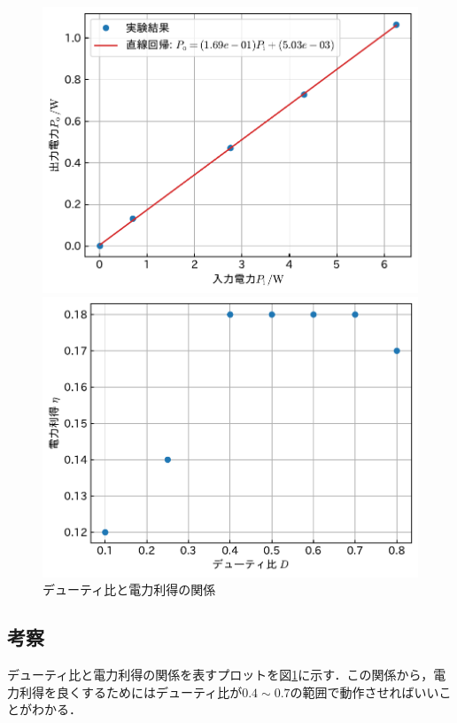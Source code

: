 \documentclass[1_power_supply.tex]{subfiles}
\begin{document}
\begin{figure}[htbp]
      \vspace{1.5mm}
      \begin{minipage}{0.45\columnwidth}
        \centering
        \includegraphics[width=0.8\columnwidth]{2_80p.pdf}
        \caption{$D=0.8$}\label{fig:2_80p}
      \end{minipage}
      \begin{minipage}{0.45\columnwidth}
        \centering
        \includegraphics[width=0.8\columnwidth]{2_d_eta.pdf}
        \caption{デューティ比と電力利得の関係}\label{fig:2_d_eta}
      \end{minipage}
    \end{figure}

  \subsection{考察}

    デューティ比と電力利得の関係を表すプロットを図\ref{fig:2_d_eta}に示す．この関係から，電力利得を良くするためにはデューティ比が$0.4\sim 0.7$の範囲で動作させればいいことがわかる．
\end{document}
